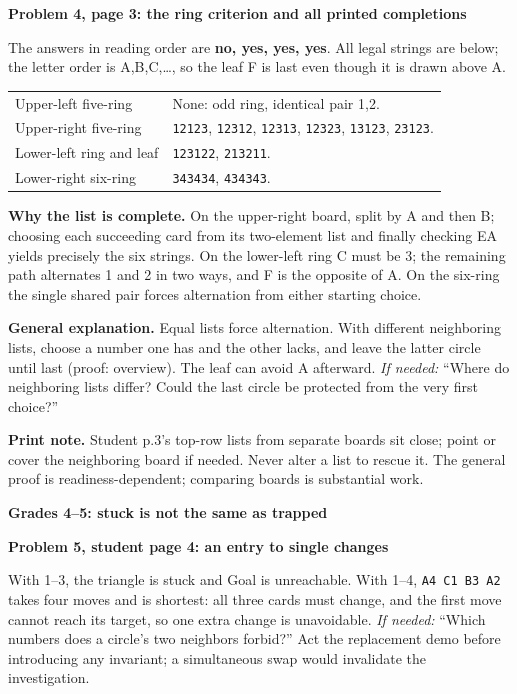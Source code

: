 \documentclass[10pt]{article}
\newcommand{\head}[1]{\par{\large\bfseries #1}\par}
\newcommand{\sub}[1]{\par\textbf{#1}\par}
\newcommand{\hint}[1]{\textit{If needed:} #1}
\newcommand{\word}[1]{\texttt{#1}}
\begin{document}
\sub{Problem 4, page 3: the ring criterion and all printed completions}
The answers in reading order are \textbf{no, yes, yes, yes}. All legal strings are below; the letter order is A,B,C,\ldots, so the leaf F is last even though it is drawn above A.
\begin{center}\renewcommand{\arraystretch}{1.3}
\begin{tabular}{p{.27\linewidth}p{.63\linewidth}}
Upper-left five-ring & None: odd ring, identical pair 1,2.\\
Upper-right five-ring & \word{12123}, \word{12312}, \word{12313}, \word{12323}, \word{13123}, \word{23123}.\\
Lower-left ring and leaf & \word{123122}, \word{213211}.\\
Lower-right six-ring & \word{343434}, \word{434343}.\\
\end{tabular}\end{center}
\textbf{Why the list is complete.} On the upper-right board, split by A and then B; choosing each succeeding card from its two-element list and finally checking EA yields precisely the six strings. On the lower-left ring C must be 3; the remaining path alternates 1 and 2 in two ways, and F is the opposite of A. On the six-ring the single shared pair forces alternation from either starting choice.

\textbf{General explanation.} Equal lists force alternation. With different neighboring lists, choose a number one has and the other lacks, and leave the latter circle until last (proof: overview). The leaf can avoid A afterward. \hint{``Where do neighboring lists differ? Could the last circle be protected from the very first choice?''}

\textbf{Print note.} Student p.3's top-row lists from separate boards sit close; point or cover the neighboring board if needed. Never alter a list to rescue it. The general proof is readiness-dependent; comparing boards is substantial work.

\newpage
\head{Grades 4--5: stuck is not the same as trapped}
\sub{Problem 5, student page 4: an entry to single changes}
With 1--3, the triangle is stuck and Goal is unreachable. With 1--4, \word{A4 C1 B3 A2} takes four moves and is shortest: all three cards must change, and the first move cannot reach its target, so one extra change is unavoidable. \hint{``Which numbers does a circle's two neighbors forbid?''} Act the replacement demo before introducing any invariant; a simultaneous swap would invalidate the investigation.
\end{document}
